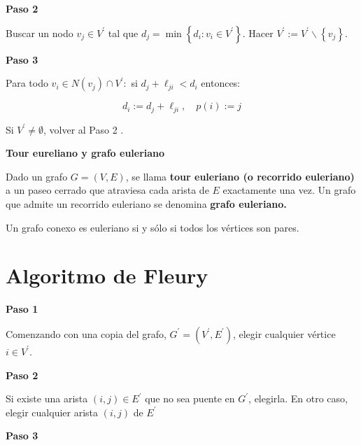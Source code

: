 \documentclass[openany]{book}
\begin{document}
\begin{center}
\textbf{Paso 2}
\end{center}

Buscar un nodo $v_{j} \in V^{\prime}$ tal que $d_{j}=\min \left\{d_{i}: v_{i} \in V^{\prime}\right\} .$ Hacer $V^{\prime}:=V^{\prime} \backslash\left\{v_{j}\right\}$.

\begin{center}
\textbf{Paso 3}
\end{center}

Para todo $v_{i} \in N\left(v_{j}\right) \cap V^{\prime}:$ si $d_{j}+\ell_{j i}<d_{i}$ entonces:

$$
d_{i}:=d_{j}+\ell_{j i}, \quad p(i):=j
$$

Si $V^{\prime} \neq \emptyset$, volver al Paso 2 .



\begin{definition}
  { \color{turquoise} \textbf{Tour eureliano y grafo euleriano}}

  Dado un grafo $G=(V, E)$, se llama \textbf{tour euleriano (o recorrido euleriano)} a un paseo cerrado que atraviesa cada arista de $E$ exactamente una vez. Un grafo que admite un recorrido euleriano se denomina \textbf{grafo euleriano.}
\end{definition}

\begin{theorem}
  Un grafo conexo es euleriano si y sólo si todos los vértices son pares.
\end{theorem}

\section{Algoritmo de Fleury}

\begin{center}
\textbf{Paso 1}
\end{center}

Comenzando con una copia del grafo, $G^{\prime}=\left(V^{\prime}, E^{\prime}\right)$, elegir cualquier vértice $i \in V^{\prime}$.

\begin{center}
\textbf{Paso 2}
\end{center}

Si existe una arista $(i, j) \in E^{\prime}$ que no sea puente en $G^{\prime}$, elegirla. En otro caso, elegir cualquier arista $(i, j)$ de $E^{\prime}$

\begin{center}
\textbf{Paso 3}
\end{center}
\end{document}
